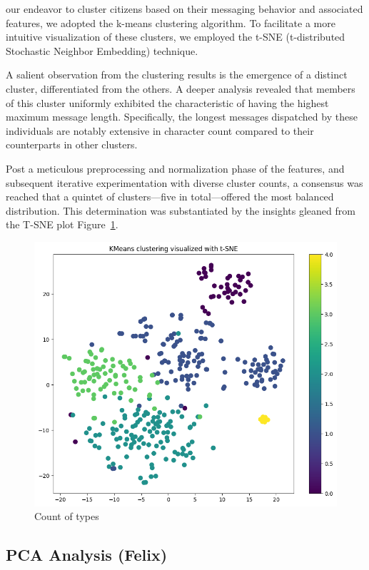 \documentclass[12pt]{article}
\begin{document}
our endeavor to cluster citizens based on their messaging behavior and associated features, we adopted the k-means clustering algorithm. To facilitate a more intuitive visualization of these clusters, we employed the t-SNE (t-distributed Stochastic Neighbor Embedding) technique. 

A salient observation from the clustering results is the emergence of a distinct cluster, differentiated from the others. A deeper analysis revealed that members of this cluster uniformly exhibited the characteristic of having the highest maximum message length. Specifically, the longest messages dispatched by these individuals are notably extensive in character count compared to their counterparts in other clusters.

Post a meticulous preprocessing and normalization phase of the features, and subsequent iterative experimentation with diverse cluster counts, a consensus was reached that a quintet of clusters—five in total—offered the most balanced distribution. This determination was substantiated by the insights gleaned 
from the T-SNE plot Figure~\ref{fig:cluster}.

\begin{figure}[h]
  \centering
  \includegraphics[width=0.7\linewidth]{images/Kmeans_5_clusters}
  \caption{Count of types}
  \label{fig:cluster}
  \end{figure}


\subsection{PCA Analysis (Felix)}
\end{document}
